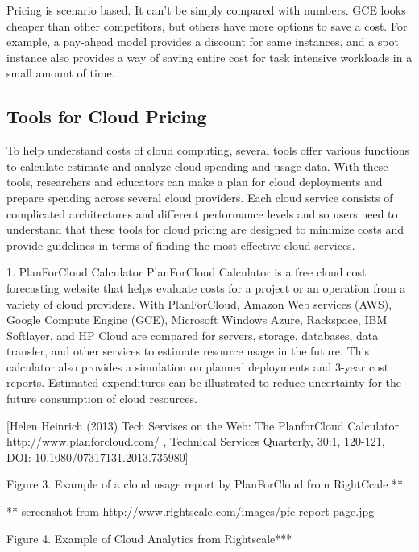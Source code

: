 \documentclass{sig-alternate}
\begin{document}
Pricing is scenario based. It can’t be simply compared with numbers. GCE looks cheaper than other competitors, but others have more options to save a cost. For example, a pay-ahead model provides a discount for same instances, and a spot instance also provides a way of saving entire cost for task intensive workloads in a small amount of time.


\subsection{Tools for Cloud Pricing}

To help understand costs of cloud computing, several tools offer various functions to calculate estimate and analyze cloud spending and usage data. With these tools, researchers and educators can make a plan for cloud deployments and prepare spending across several cloud providers. Each cloud service consists of complicated architectures and different performance levels and so users need to understand that these tools for cloud pricing are designed to minimize costs and provide guidelines in terms of finding the most effective cloud services.

1. PlanForCloud Calculator
PlanForCloud Calculator is a free cloud cost forecasting website that
helps evaluate costs for a project or an operation from a variety of
cloud providers. With PlanForCloud, Amazon Web services (AWS), Google
Compute Engine (GCE), Microsoft Windows Azure, Rackspace, IBM
Softlayer, and HP Cloud are compared for servers, storage, databases,
data transfer, and other services to estimate resource usage in the
future. This calculator also provides a simulation on planned
deployments and 3-year cost reports. Estimated expenditures can be
illustrated to reduce uncertainty for the future consumption of cloud
resources. 


[Helen Heinrich (2013) Tech Servises on the Web: The PlanforCloud
Calculator http://www.planforcloud.com/ , Technical Services Quarterly, 30:1, 120-121, DOI:
10.1080/07317131.2013.735980]

 
Figure 3. Example of a cloud usage report by PlanForCloud from RightCcale **

** screenshot from http://www.rightscale.com/images/pfc-report-page.jpg


 
Figure 4. Example of Cloud Analytics from Rightscale***
\end{document}
